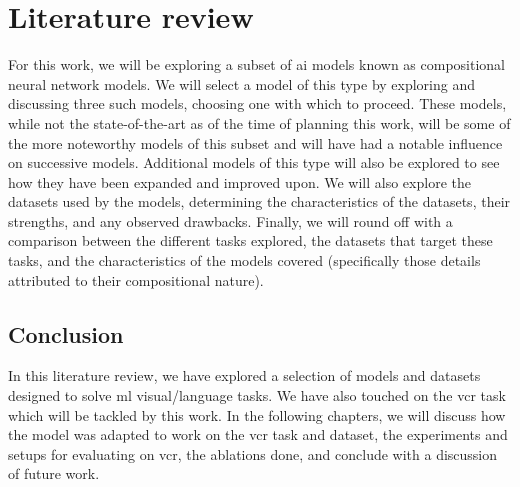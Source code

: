 \chapter{Literature review}
\label{chp:literature_review}

For this work, we will be exploring a subset of \gls{ai} models known as compositional neural network models.
We will select a model of this type by exploring and discussing three such models, choosing one with which to proceed.
These models, while not the state-of-the-art as of the time of planning this work, will be some of the more noteworthy models of this subset and will have had a notable influence on successive models.
Additional models of this type will also be explored to see how they have been expanded and improved upon.
We will also explore the datasets used by the models, determining the characteristics of the datasets, their strengths, and any observed drawbacks.
Finally, we will round off with a comparison between the different tasks explored, the datasets that target these tasks, and the characteristics of the models covered (specifically those details attributed to their compositional nature).









\section{Conclusion}
\label{sec:literature_review_conclusion}

In this literature review, we have explored a selection of models and datasets designed to solve \gls{ml} visual/language tasks.
We have also touched on the \gls{vcr} task which will be tackled by this work.
In the following chapters, we will discuss how the model was adapted to work on the \gls{vcr} task and dataset, the experiments and setups for evaluating on \gls{vcr}, the ablations done, and conclude with a discussion of future work.
